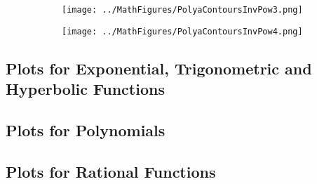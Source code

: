 \documentclass[12pt]{article}
\begin{document}
\begin{figure}[h]
\caption{Polya potential contours of $f(z) = 1/z^3$ and $f(z) = 1/z^4$}	
\label{Fig:ContoursInvPow_3_4}	
\centering
\begin{subfigure}[b]{0.49\textwidth}
\centering
\texttt{[image: ../MathFigures/PolyaContoursInvPow3.png]}
\end{subfigure}
\begin{subfigure}[b]{0.49\textwidth}
\centering
\texttt{[image: ../MathFigures/PolyaContoursInvPow4.png]}
\end{subfigure}
\end{figure}



\subsection{Plots for Exponential, Trigonometric and Hyperbolic Functions}

\subsection{Plots for Polynomials}

\subsection{Plots for Rational Functions}


\end{document}
